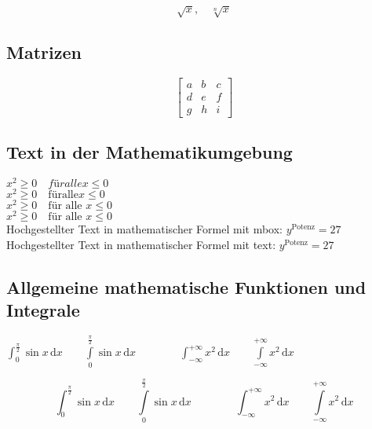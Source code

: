 \documentclass[10pt, a4paper]{article}
\numberwithin{equation}{section}
\numberwithin{figure}{section}
\begin{document}
\[ \sqrt{x},\quad \sqrt[n]{x}  \]

\subsection{Matrizen}

\begin{equation}
\begin{bmatrix}
  a & b & c \\
  d & e & f \\
  g & h & i
 \end{bmatrix}
\end{equation}

\subsection{Text in der Mathematikumgebung}
\( x^2 \geq 0\quad für alle x \leq 0 \)\\ %
\( x^2 \geq 0\quad \mathrm{für alle } x \leq 0 \)\\ %
\( x^2 \geq 0\quad \mbox{für alle } x \leq 0 \)\\ %
\( x^2 \geq 0\quad \text{für alle } x \leq 0 \)\\ %
Hochgestellter Text in mathematischer Formel mit mbox: \quad \( y^{\mbox{Potenz}}=27\)\\
Hochgestellter Text in mathematischer Formel mit text: \quad \( y^{\text{Potenz}}=27\)

\subsection{Allgemeine mathematische Funktionen und Integrale}

\( \int_{0}^{\frac{\pi}{2}} \sin x\,\mathrm{d}x \qquad
\int\limits_{0}^{\frac{\pi}{2}} \sin x\,\mathrm{d}x \qquad\qquad
\int_{-\infty}^{+\infty}x^2\,\mathrm{d}x \qquad
\int\limits_{-\infty}^{+\infty}x^2\,\mathrm{d}x\)

\[ \int_{0}^{\frac{\pi}{2}} \sin x\,\mathrm{d}x \qquad
\int\limits_{0}^{\frac{\pi}{2}} \sin x\,\mathrm{d}x \qquad\qquad
\int_{-\infty}^{+\infty}x^2\,\mathrm{d}x \qquad
\int\limits_{-\infty}^{+\infty}x^2\,\mathrm{d}x\]


\end{document}
